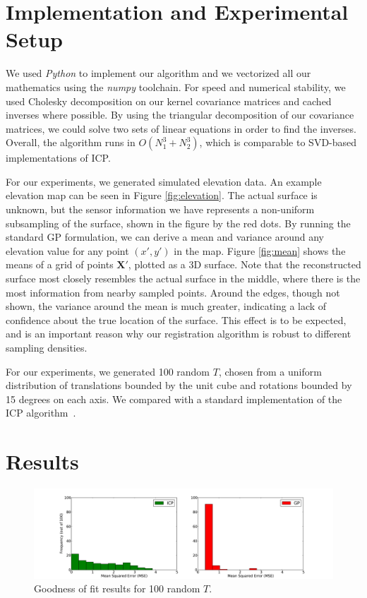 \documentclass{article} %
\begin{document}
\section{Implementation and Experimental Setup}

We used \emph{Python} to implement our algorithm and we vectorized all our mathematics using the \emph{numpy} toolchain. For speed and numerical stability, we used Cholesky decomposition on our kernel covariance matrices and cached inverses where possible. By using the triangular decomposition of our covariance matrices, we could solve two sets of linear equations in order to find the inverses. Overall, the algorithm runs in $O(N_1^3 + N_2^3)$, which is comparable to SVD-based implementations of ICP.

For our experiments, we generated simulated elevation data. An example elevation map can be seen in Figure \ref{fig:elevation}. The actual surface is unknown, but the sensor information we have represents a non-uniform subsampling of the surface, shown in the figure by the red dots. By running the standard GP formulation, we can derive a mean and variance around any elevation value for any point $(x',y')$ in the map. Figure \ref{fig:mean} shows the means of a grid of points $\mathbf{X'}$, plotted as a 3D surface. Note that the reconstructed surface most closely resembles the actual surface in the middle, where there is the most information from nearby sampled points. Around the edges, though not shown, the variance around the mean is much greater, indicating a lack of confidence about the true location of the surface. This effect is to be expected, and is an important reason why our registration algorithm is robust to different sampling densities.

For our experiments, we generated 100 random $T$, chosen from a uniform distribution of translations bounded by the unit cube and rotations bounded by 15 degrees on each axis. We compared with a standard implementation of the ICP algorithm~\cite{besl_method_1992}. 


\section{Results}

\begin{figure}
\begin{center}
\includegraphics[width=5.7in]{goodnessoffit3.pdf}
\end{center}
\caption{Goodness of fit results for 100 random $T$.}
\label{fig:mse}
\end{figure}
\end{document}

